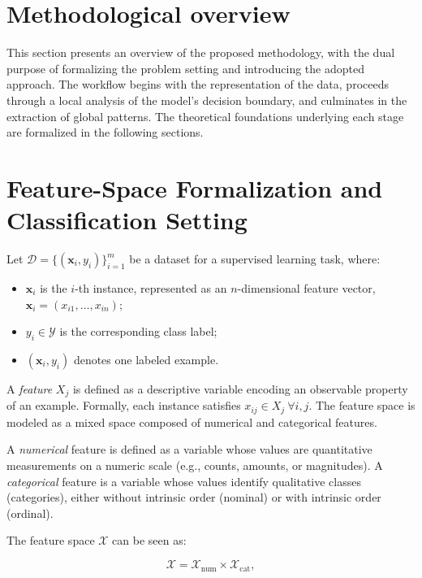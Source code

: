 \section{Methodological overview}

This section presents an overview of the proposed methodology, with the dual purpose of formalizing the problem setting and introducing the adopted approach. The workflow begins with the representation of the data, proceeds through a local analysis of the model's decision boundary, and culminates in the extraction of global patterns. The theoretical foundations underlying each stage are formalized in the following sections.

\section{Feature-Space Formalization and Classification Setting}
\label{sec:feature-space-formalization}

Let $\mathcal{D} = \{(\mathbf{x}_i, y_i)\}_{i = 1}^{m}$ be a dataset for a supervised learning task, where:

\begin{itemize}
  \item $\mathbf{x}_i$ is the $i$-th instance, represented as an $n$-dimensional feature vector, $\mathbf{x}_i = (x_{i1},\ldots,x_{in})$;
  \item $y_i \in \mathcal{Y}$ is the corresponding class label;
  \item $(\mathbf{x}_i,y_i)$ denotes one labeled example.
\end{itemize}

A \emph{feature} $X_j$ is defined as a descriptive variable encoding an observable property of an example. Formally, each instance satisfies $x_{ij} \in X_j \ \forall i,j$. The feature space is modeled as a mixed space composed of numerical and categorical features.

A \emph{numerical} feature is defined as a variable whose values are quantitative measurements on a numeric scale (e.g., counts, amounts, or magnitudes). A \emph{categorical} feature is a variable whose values identify qualitative classes (categories), either without intrinsic order (nominal) or with intrinsic order (ordinal). 

The feature space $\mathcal{X}$ can be seen as:

\begin{equation}
  \mathcal{X} = \mathcal{X}_{\mathrm{num}} \times \mathcal{X}_{\mathrm{cat}},
\end{equation}

